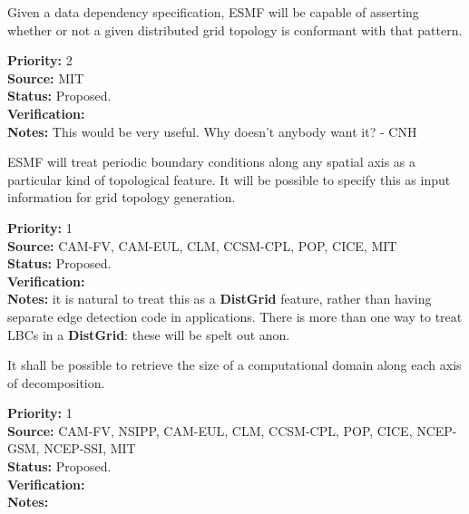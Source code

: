 
Given a data dependency specification, ESMF will be capable of
asserting whether or not a given distributed grid topology is
conformant with that pattern.

\begin{reqlist}
{\bf Priority:} 2 \\ 
{\bf Source:} MIT \\
{\bf Status:} Proposed. \\
{\bf Verification:} \\
{\bf Notes:} This would be very useful. Why doesn't anybody want it? - CNH
\end{reqlist}


ESMF will treat periodic boundary conditions along any spatial axis as
a particular kind of topological feature. It will be possible to
specify this as input information for grid topology generation.

\begin{reqlist}
{\bf Priority:} 1 \\ 
{\bf Source:} CAM-FV, CAM-EUL, CLM, CCSM-CPL, POP, CICE, MIT \\
{\bf Status:} Proposed. \\
{\bf Verification:} \\
{\bf Notes:} it is natural to treat this as a \textbf{DistGrid}
  feature, rather than having separate edge detection code in
  applications. There is more than one way to treat LBCs in a
  \textbf{DistGrid}: these will be spelt out anon.
   
\end{reqlist}




It shall be possible to retrieve the size of a computational domain
along each axis of decomposition.

\begin{reqlist}
{\bf Priority:} 1 \\ 
{\bf Source:} CAM-FV, NSIPP, CAM-EUL, CLM, CCSM-CPL, POP, CICE, NCEP-GSM, NCEP-SSI, MIT \\
{\bf Status:} Proposed. \\
{\bf Verification:} \\
{\bf Notes:}
\end{reqlist}


